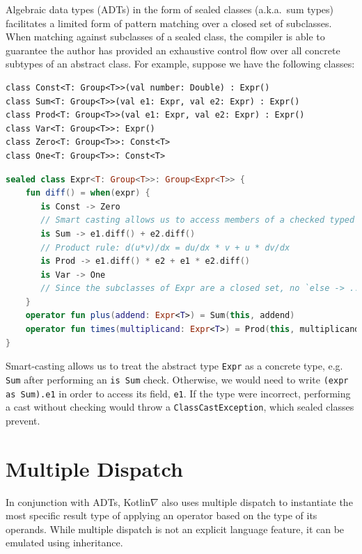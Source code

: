 \documentclass[12pt,initial,twoside,maitrise]{dms}
\def\inline{\lstinline[basicstyle=\ttfamily]}
\numberwithin{equation}{section}
\numberwithin{table}{chapter}
\numberwithin{figure}{chapter}
\begin{document}
\noindent Algebraic data types (ADTs) in the form of sealed classes (a.k.a.\ sum types) facilitates a limited form of pattern matching over a closed set of subclasses. When matching against subclasses of a sealed class, the compiler is able to guarantee the author has provided an exhaustive control flow over all concrete subtypes of an abstract class. For example, suppose we have the following classes:
%
\begin{lstlisting}
class Const<T: Group<T>>(val number: Double) : Expr()
class Sum<T: Group<T>>(val e1: Expr, val e2: Expr) : Expr()
class Prod<T: Group<T>>(val e1: Expr, val e2: Expr) : Expr()
class Var<T: Group<T>>: Expr()
class Zero<T: Group<T>>: Const<T>
class One<T: Group<T>>: Const<T>
\end{lstlisting}
%
\begin{lstlisting}[caption={Users must handle all subclasses when branching on the type of a sealed class, as incomplete control flow will not compile (instead of failing silently at runtime).}, language=Kotlin]
sealed class Expr<T: Group<T>>: Group<Expr<T>> {
    fun diff() = when(expr) {
       is Const -> Zero
       // Smart casting allows us to access members of a checked typed without explicit casting
       is Sum -> e1.diff() + e2.diff()
       // Product rule: d(u*v)/dx = du/dx * v + u * dv/dx
       is Prod -> e1.diff() * e2 + e1 * e2.diff()
       is Var -> One
       // Since the subclasses of Expr are a closed set, no `else -> ...` is required.
    }
    operator fun plus(addend: Expr<T>) = Sum(this, addend)
    operator fun times(multiplicand: Expr<T>) = Prod(this, multiplicand)
}
\end{lstlisting}
%
Smart-casting allows us to treat the abstract type \inline{Expr} as a concrete type, e.g. \inline{Sum} after performing an \inline{is Sum} check. Otherwise, we would need to write \inline{(expr as Sum).e1} in order to access its field, \inline{e1}. If the type were incorrect, performing a cast without checking would throw a \inline{ClassCastException}, which sealed classes prevent.

\section{Multiple Dispatch}\label{sec:multiple-dispatch}

In conjunction with ADTs, Kotlin$\nabla$ also uses multiple dispatch to instantiate the most specific result type of applying an operator based on the type of its operands. While multiple dispatch is not an explicit language feature, it can be emulated using inheritance.
\end{document}
